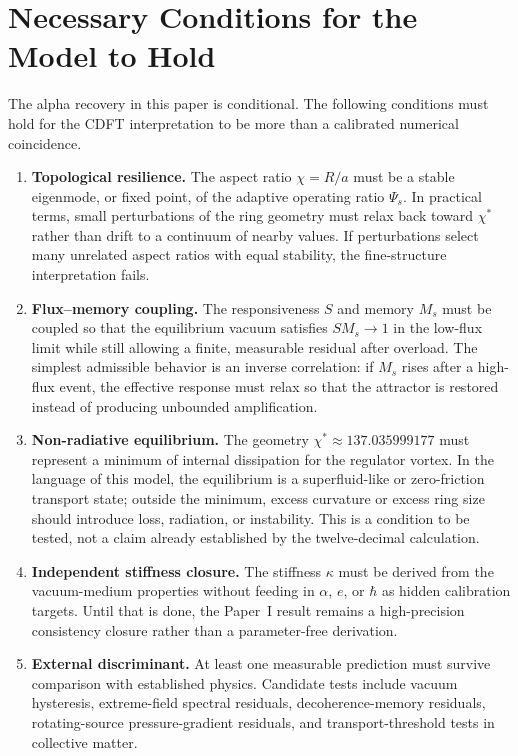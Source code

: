 \documentclass[11pt]{article}
\begin{document}
\section{Necessary Conditions for the Model to Hold}

The alpha recovery in this paper is conditional. The following conditions must
hold for the CDFT interpretation to be more than a calibrated numerical
coincidence.

\begin{enumerate}
\item \textbf{Topological resilience.}
The aspect ratio $\chi=R/a$ must be a stable eigenmode, or fixed point, of the
adaptive operating ratio $\Psi_s$. In practical terms, small perturbations of
the ring geometry must relax back toward $\chi^*$ rather than drift to a
continuum of nearby values. If perturbations select many unrelated aspect
ratios with equal stability, the fine-structure interpretation fails.

\item \textbf{Flux--memory coupling.}
The responsiveness $S$ and memory $M_s$ must be coupled so that the equilibrium
vacuum satisfies $S M_s\to1$ in the low-flux limit while still allowing a
finite, measurable residual after overload. The simplest admissible behavior is
an inverse correlation: if $M_s$ rises after a high-flux event, the effective
response must relax so that the attractor is restored instead of producing
unbounded amplification.

\item \textbf{Non-radiative equilibrium.}
The geometry $\chi^*\approx137.035999177$ must represent a minimum of internal
dissipation for the regulator vortex. In the language of this model, the
equilibrium is a superfluid-like or zero-friction transport state; outside the
minimum, excess curvature or excess ring size should introduce loss, radiation,
or instability. This is a condition to be tested, not a claim already
established by the twelve-decimal calculation.

\item \textbf{Independent stiffness closure.}
The stiffness $\kappa$ must be derived from the vacuum-medium properties without
feeding in $\alpha$, $e$, or $\hbar$ as hidden calibration targets. Until that is
done, the Paper~I result remains a high-precision consistency closure rather
than a parameter-free derivation.

\item \textbf{External discriminant.}
At least one measurable prediction must survive comparison with established
physics. Candidate tests include vacuum hysteresis, extreme-field spectral
residuals, decoherence-memory residuals, rotating-source pressure-gradient
residuals, and transport-threshold tests in collective matter.
\end{enumerate}
\end{document}

